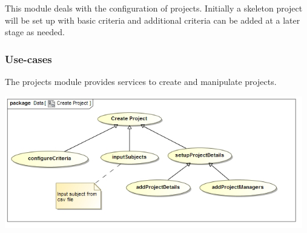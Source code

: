 This module deals with the configuration of projects. Initially a skeleton project will be set up with basic criteria 
and additional criteria can be added at a later stage as needed.
\subsubsection{Use-cases}
The projects module provides services to create and manipulate projects.\par
\includegraphics[width=13cm]{./graphics/createProjectUseCase.jpg}
    \rule{0\linewidth}{0.15\linewidth}\par
